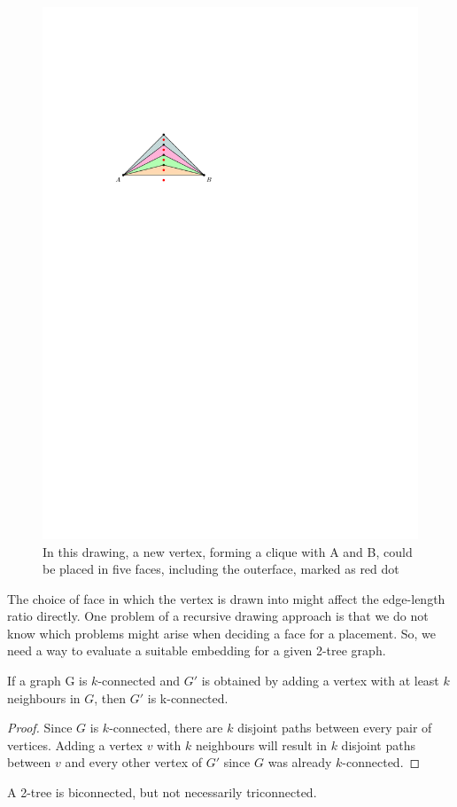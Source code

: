 \begin{figure}[H]
	\centering
	\includegraphics[width=.7\linewidth,page=1]{drawings/k-trees.pdf}
	\caption{In this drawing, a new vertex, forming a clique with A and B, could be placed in five faces, including the outerface, marked as red dot}\label{im:multiple-faces}
\end{figure}
The choice of face in which the vertex is drawn into might affect the edge-length ratio directly. One problem of a recursive drawing approach is that we do not know which problems might arise when deciding a face for a placement. So, we need a way to evaluate a suitable embedding for a given 2-tree graph.
\begin{lemma}
	If a graph G is $k$-connected and $G'$ is obtained by adding a vertex with at least $k$ neighbours in $G$, then $G'$ is k-connected.
\end{lemma}
\begin{proof}
	Since $G$ is $k$-connected, there are $k$ disjoint paths between every pair of vertices. Adding a vertex $v$ with $k$ neighbours will result in $k$ disjoint paths between $v$ and every other vertex of $G'$ since $G$ was already $k$-connected.
\end{proof}
\begin{theorem}
	A 2-tree is biconnected, but not necessarily triconnected.
\end{theorem}
